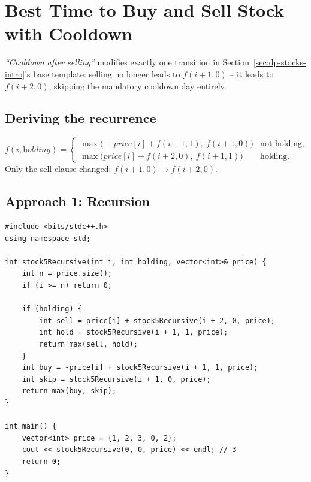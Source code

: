 \section{Best Time to Buy and Sell Stock with Cooldown}
\label{sec:dp-stock-5}


\begin{patternbox}
\emph{``Cooldown after selling''} modifies exactly one transition in
Section~\ref{sec:dp-stocks-intro}'s base template: selling no longer
leads to $f(i{+}1, 0)$ -- it leads to $f(i{+}2, 0)$, skipping the
mandatory cooldown day entirely.
\end{patternbox}

\subsection*{Deriving the recurrence}

\[
  f(i, \textit{holding}) =
  \begin{cases}
    \max\big(-\textit{price}[i] + f(i{+}1, 1),\ f(i{+}1, 0)\big) &
    \text{not holding}, \\
    \max\big(\textit{price}[i] + f(i{+}2, 0),\ f(i{+}1, 1)\big) &
    \text{holding.}
  \end{cases}
\]
Only the sell clause changed: $f(i{+}1,0) \to f(i{+}2,0)$.

\subsection*{Approach 1: Recursion}

\begin{lstlisting}
#include <bits/stdc++.h>
using namespace std;

int stock5Recursive(int i, int holding, vector<int>& price) {
    int n = price.size();
    if (i >= n) return 0;

    if (holding) {
        int sell = price[i] + stock5Recursive(i + 2, 0, price);
        int hold = stock5Recursive(i + 1, 1, price);
        return max(sell, hold);
    }
    int buy = -price[i] + stock5Recursive(i + 1, 1, price);
    int skip = stock5Recursive(i + 1, 0, price);
    return max(buy, skip);
}

int main() {
    vector<int> price = {1, 2, 3, 0, 2};
    cout << stock5Recursive(0, 0, price) << endl; // 3
    return 0;
}
\end{lstlisting}

